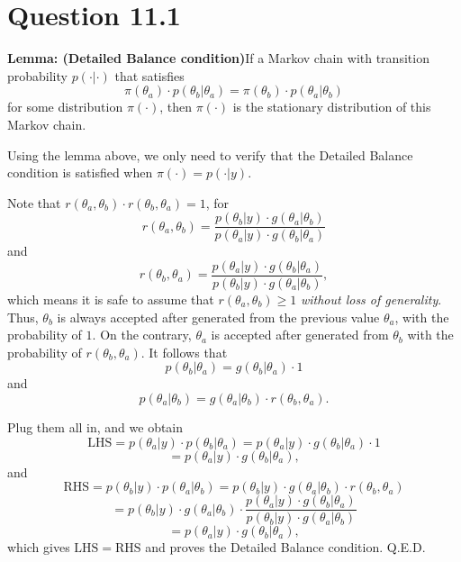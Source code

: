 \documentclass{article}
\begin{document}
\section*{Question 11.1}
{
    \textbf{Lemma: (Detailed Balance condition)}\quad If a Markov chain with transition probability $p(\cdot|\cdot)$ that satisfies
    $$\pi(\theta_a) \cdot p(\theta_b|\theta_a) = \pi(\theta_b) \cdot p(\theta_a|\theta_b)$$ for some distribution $\pi(\cdot)$, then $\pi(\cdot)$ is the stationary distribution of this Markov chain.

    Using the lemma above, we only need to verify that the Detailed Balance condition is satisfied when $\pi(\cdot) = p(\cdot|y)$.

    Note that $r(\theta_a, \theta_b) \cdot r(\theta_b, \theta_a) = 1$, for
    $$r(\theta_a, \theta_b) = \frac{ p(\theta_b|y) \cdot g(\theta_a|\theta_b) }{ p(\theta_a|y) \cdot g(\theta_b|\theta_a) }$$ and
    $$r(\theta_b, \theta_a) = \frac{ p(\theta_a|y) \cdot g(\theta_b|\theta_a) }{ p(\theta_b|y) \cdot g(\theta_a|\theta_b) },$$
    which means it is safe to assume that $r(\theta_a, \theta_b) \geq 1$ \emph{without loss of generality}. Thus, $\theta_b$ is always accepted after generated from the previous value $\theta_a$, with the probability of $1$. On the contrary, $\theta_a$ is accepted after generated from $\theta_b$ with the probability of $r(\theta_b, \theta_a)$. It follows that
    $$p(\theta_b|\theta_a) = g(\theta_b|\theta_a) \cdot 1$$ and 
    $$p(\theta_a|\theta_b) = g(\theta_a|\theta_b) \cdot r(\theta_b, \theta_a).$$

    Plug them all in, and we obtain
    $$\mathrm{LHS} = p(\theta_a|y) \cdot p(\theta_b|\theta_a) = p(\theta_a|y) \cdot g(\theta_b|\theta_a) \cdot 1$$
    $$= p(\theta_a|y) \cdot g(\theta_b|\theta_a),$$ and
    $$\mathrm{RHS} = p(\theta_b|y) \cdot p(\theta_a|\theta_b) = p(\theta_b|y) \cdot g(\theta_a|\theta_b) \cdot r(\theta_b, \theta_a)$$
    $$= p(\theta_b|y) \cdot g(\theta_a|\theta_b) \cdot \frac{ p(\theta_a|y) \cdot g(\theta_b|\theta_a) }{ p(\theta_b|y) \cdot g(\theta_a|\theta_b) }$$
    $$= p(\theta_a|y) \cdot g(\theta_b|\theta_a),$$
    which gives $\mathrm{LHS} = \mathrm{RHS}$ and proves the Detailed Balance condition. Q.E.D.
}

\clearpage
\end{document}

